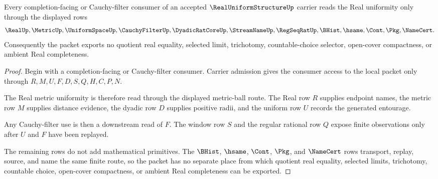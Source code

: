 
\begin{theorem}
\label{thm:real-uniform-structure-metric-uniformity-handoff}
Every completion-facing or Cauchy-filter consumer of an accepted $\RealUniformStructureUp$ carrier reads the Real uniformity only through the displayed rows
$$
\RealUp,\MetricUp,\UniformSpaceUp,\CauchyFilterUp,\DyadicRatCoreUp,\StreamNameUp,\RegSeqRatUp,\BHist,\hsame,\Cont,\Pkg,\NameCert .
$$
Consequently the packet exports no quotient real equality, selected limit, trichotomy, countable-choice selector, open-cover compactness, or ambient Real completeness.
\end{theorem}
\begin{proof}
Begin with a completion-facing or Cauchy-filter consumer. Carrier admission gives the consumer access to the local packet only through $R,M,U,F,D,S,Q,H,C,P,N$.

The Real metric uniformity is therefore read through the displayed metric-ball route. The Real row $R$ supplies endpoint names, the metric row $M$ supplies distance evidence, the dyadic row $D$ supplies positive radii, and the uniform row $U$ records the generated entourage.

Any Cauchy-filter use is then a downstream read of $F$. The window row $S$ and the regular rational row $Q$ expose finite observations only after $U$ and $F$ have been replayed.

The remaining rows do not add mathematical primitives. The $\BHist$, $\hsame$, $\Cont$, $\Pkg$, and $\NameCert$ rows transport, replay, source, and name the same finite route, so the packet has no separate place from which quotient real equality, selected limits, trichotomy, countable choice, open-cover compactness, or ambient Real completeness can be exported.
\end{proof}

